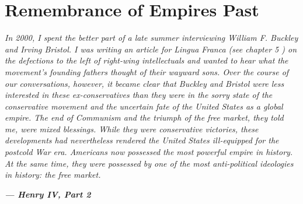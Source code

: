  
 \chapter{Remembrance of Empires Past}  

 \label{Remembrance of Empires Past}  
 
 
\par
 
 
 \textit{	In 2000, I spent the better part of a late summer interviewing William F. Buckley and Irving Bristol. I was writing an article for Lingua Franca (see chapter {{\color{blue} 5} }) on the defections to the left of right-wing intellectuals and wanted to hear what the movement’s founding fathers thought of their wayward sons. Over the course of our conversations, however, it became clear that Buckley and Bristol were less interested in these ex-conservatives than they were in the sorry state of the conservative movement and the uncertain fate of the United States as a global empire. The end of Communism and the triumph of the free market, they told me, were mixed blessings. While they were conservative victories, these developments had nevertheless rendered the United States ill-equipped for the postcold War era. Americans now possessed the most powerful empire in history. At the same time, they were possessed by one of the most anti-political ideologies in history: the free market.}  

 
\par
 
 
 
\par
 

 \textbf{\textit{	— Henry IV, Part 2} }  

 
\par
 

